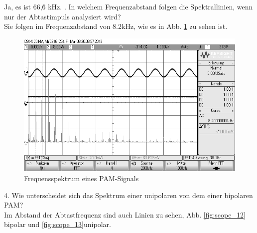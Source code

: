\documentclass[12pt,a4paper]{scrartcl}
\begin{document}
       Ja, es ist 66,\.{6} kHz.
       . In welchem Frequenzabstand folgen die Spektrallinien, wenn nur der Abtastimpuls analysiert wird?\\
       Sie folgen im Frequenzabstand von 8.2kHz, wie es in Abb. \ref{fig:scope_11} zu sehen ist. \\
       \begin{figure}[htbp]
    \begin{minipage}{0.72\textwidth}
     \centering
      \includegraphics[width=1\textwidth]{scope_11}
      \caption{Frequensspektrum eines PAM-Signals}
      \label{fig:scope_11}
    \end{minipage}\hfill
  \end{figure} 
  
       4. Wie unterscheidet sich das Spektrum einer unipolaren von dem einer bipolaren PAM?\\
       Im Abstand der Abtastfrequenz sind auch Linien zu sehen, Abb. \ref{fig:scope_12} bipolar und \ref{fig:scope_13}unipolar.
       
\end{document}

